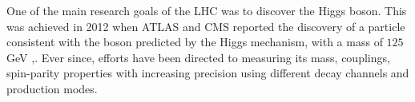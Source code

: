 
One of the main research goals of the LHC was to discover the Higgs boson. This was achieved in 2012 when ATLAS and CMS reported the discovery of a particle consistent with the boson predicted by the Higgs mechanism, with a mass of $125$ GeV \cite{higgsDiscoveryATLAS},\cite{higgsDiscoveryCMS}. Ever since, efforts have been directed to measuring its mass, couplings, spin-parity properties with increasing precision using different decay channels and production modes. 

